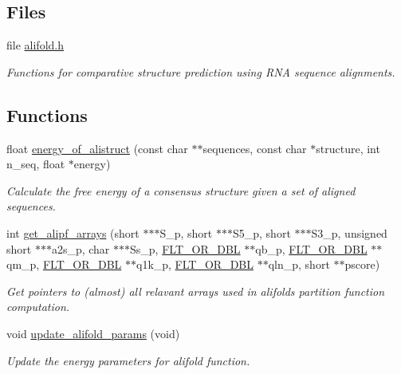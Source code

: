 \subsection*{Files}
\begin{DoxyCompactItemize}
\item 
file \hyperlink{alifold_8h}{alifold.\+h}
\begin{DoxyCompactList}\small\item\em Functions for comparative structure prediction using R\+NA sequence alignments. \end{DoxyCompactList}\end{DoxyCompactItemize}
\subsection*{Functions}
\begin{DoxyCompactItemize}
\item 
float \hyperlink{group__consensus__fold_ga1c48869c03b49a342bf4cbdd61900081}{energy\+\_\+of\+\_\+alistruct} (const char $\ast$$\ast$sequences, const char $\ast$structure, int n\+\_\+seq, float $\ast$energy)
\begin{DoxyCompactList}\small\item\em Calculate the free energy of a consensus structure given a set of aligned sequences. \end{DoxyCompactList}\item 
int \hyperlink{group__consensus__fold_ga5349960075b1847720a2e9df021e2675}{get\+\_\+alipf\+\_\+arrays} (short $\ast$$\ast$$\ast$S\+\_\+p, short $\ast$$\ast$$\ast$S5\+\_\+p, short $\ast$$\ast$$\ast$S3\+\_\+p, unsigned short $\ast$$\ast$$\ast$a2s\+\_\+p, char $\ast$$\ast$$\ast$Ss\+\_\+p, \hyperlink{group__data__structures_ga31125aeace516926bf7f251f759b6126}{F\+L\+T\+\_\+\+O\+R\+\_\+\+D\+BL} $\ast$$\ast$qb\+\_\+p, \hyperlink{group__data__structures_ga31125aeace516926bf7f251f759b6126}{F\+L\+T\+\_\+\+O\+R\+\_\+\+D\+BL} $\ast$$\ast$qm\+\_\+p, \hyperlink{group__data__structures_ga31125aeace516926bf7f251f759b6126}{F\+L\+T\+\_\+\+O\+R\+\_\+\+D\+BL} $\ast$$\ast$q1k\+\_\+p, \hyperlink{group__data__structures_ga31125aeace516926bf7f251f759b6126}{F\+L\+T\+\_\+\+O\+R\+\_\+\+D\+BL} $\ast$$\ast$qln\+\_\+p, short $\ast$$\ast$pscore)
\begin{DoxyCompactList}\small\item\em Get pointers to (almost) all relavant arrays used in alifold\textquotesingle{}s partition function computation. \end{DoxyCompactList}\item 
void \hyperlink{group__consensus__fold_gac484c6bd429bafbd353b91044508d8e9}{update\+\_\+alifold\+\_\+params} (void)
\begin{DoxyCompactList}\small\item\em Update the energy parameters for alifold function. \end{DoxyCompactList}\end{DoxyCompactItemize}

